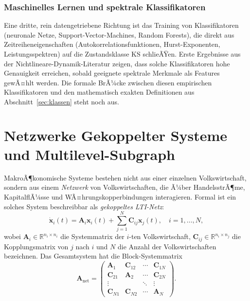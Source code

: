 ﻿\documentclass[12pt, a4paper, titlepage]{report}
\theoremstyle{definition}
\theoremstyle{remark}
\newcommand{\R}{\mathbb{R}}
\newcommand{\vx}{\bm{x}}
\newcommand{\vA}{\bm{A}}
\newcommand{\vC}{\bm{C}}
\newcommand{\KS}{\mathrm{KS}}
\begin{document}
\subsubsection*{Maschinelles Lernen und spektrale Klassifikatoren}

Eine dritte, rein datengetriebene Richtung ist das Training von Klassifikatoren
(neuronale Netze, Support-Vector-Machines, Random Forests), die direkt aus
Zeitreiheneigenschaften (Autokorrelationsfunktionen, Hurst-Exponenten,
Leistungsspektren) auf die Zustandsklasse $\KS$ schlieÃŸen. Erste Ergebnisse aus
der Nichtlineare-Dynamik-Literatur zeigen, dass solche Klassifikatoren hohe
Genauigkeit erreichen, sobald geeignete spektrale Merkmale als Features gewÃ¤hlt werden.
Die formale BrÃ¼cke zwischen diesen empirischen Klassifikatoren und den mathematisch
exakten Definitionen aus Abschnitt~\ref{sec:klassen} steht noch aus.

\section{Netzwerke Gekoppelter Systeme und Multilevel-Subgraph}
\label{subsec:netzwerke}

MakroÃ¶konomische Systeme bestehen nicht aus einer einzelnen Volkswirtschaft, sondern
	aus einem \emph{Netzwerk} von Volkswirtschaften, die Ã¼ber HandelsstrÃ¶me, KapitalflÃ¼sse
und WÃ¤hrungskopper\-bindungen interagieren. Formal ist ein solches System beschreibbar
als \emph{gekoppeltes LTI-Netz}:
\begin{equation}
  \dot{\vx}_i(t) = \vA_i\vx_i(t) + \sum_{j=1}^{N} \vC_{ij}\vx_j(t), \quad i = 1, \ldots, N,
  \label{eq:netz}
\end{equation}
wobei $\vA_i \in \R^{n_i \times n_i}$ die Systemmatrix der $i$-ten Volkswirtschaft,
$\vC_{ij} \in \R^{n_i \times n_j}$ die Kopplungsmatrix von $j$ nach $i$
und $N$ die Anzahl der Volkswirtschaften bezeichnen. Das Gesamtsystem hat die
Block-Systemmatrix
\begin{equation}
  \vA_{\mathrm{net}} = \begin{pmatrix}
    \vA_1 & \vC_{12} & \cdots & \vC_{1N} \\
    \vC_{21} & \vA_2 & \cdots & \vC_{2N} \\
    \vdots & & \ddots & \vdots \\
    \vC_{N1} & \vC_{N2} & \cdots & \vA_N
  \end{pmatrix}.
  \label{eq:blockmat}
\end{equation}
\end{document}
